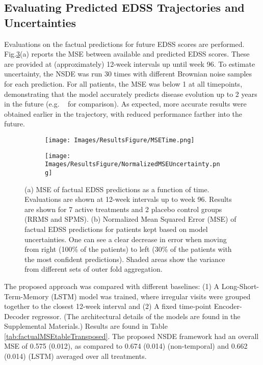 \documentclass[runningheads]{llncs}
\begin{document}
\subsection{Evaluating Predicted EDSS Trajectories and Uncertainties}
\label{sec:Factual}
Evaluations on the factual predictions for future EDSS scores are performed. Fig.\ref{fig:mse_results}(a) reports the MSE between available and predicted EDSS scores. These are provided at (approximately) 12-week intervals up until week 96. To estimate uncertainty, the NSDE was run 30 times with different Brownian noise samples for each prediction. For all patients, the MSE was below 1 at all timepoints, demonstrating that the model accurately predicts disease evolution up to 2 years in the future (e.g. ~\cite{Norcliffe2023} for comparison). As expected, more accurate results were obtained earlier in the trajectory, with reduced performance farther into the future. 

\begin{figure}
\centering
\begin{subfigure}{.5\textwidth}
  \centering
    \texttt{[image: Images/ResultsFigure/MSETime.png]}
    \caption{}
  \label{fig:msea}
\end{subfigure}%
\begin{subfigure}{.5\textwidth}
  \centering
     \texttt{[image: Images/ResultsFigure/NormalizedMSEUncertainty.png]} 
  \caption{}
  \label{fig:mseb}
\end{subfigure}
    \caption{(a) MSE of factual EDSS predictions as a function of time. Evaluations are shown at  12-week intervals up to week 96. Results are shown for 7 active treatments and 2 placebo control groups (RRMS and SPMS). (b) Normalized Mean Squared Error (MSE) of factual EDSS predictions for patients kept based on model uncertainties. One can see a clear decrease in error when moving from right (100\% of the patients) to left (30\% of the patients with the most confident predictions). Shaded areas show the variance from different sets of outer fold aggregation.}
\label{fig:mse_results}
\end{figure}
\noindent The proposed approach was compared with different baselines: (1) A Long-Short-Term-Memory (LSTM) model was trained, where irregular visits were grouped together to the closest 12-week interval and (2) A fixed time-point Encoder-Decoder regressor. (The architectural details of the models are found in the Supplemental Materials.) Results are found in Table \ref{tab:factualMSEtableTransposed}. The proposed NSDE framework had an overall MSE of 0.575 (0.012), as compared to 0.674 (0.014) (non-temporal) and 0.662 (0.014) (LSTM) averaged over all treatments. 
\end{document}
